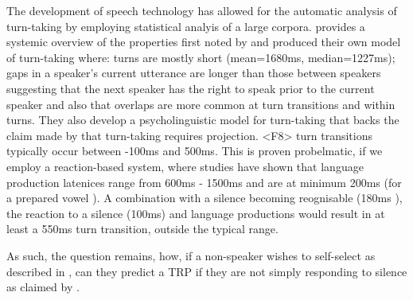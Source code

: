 \documentclass[logo,bsc,singlespacing,parskip]{infthesis}
\begin{document}
The development of speech technology has allowed for the automatic analysis of turn-taking by employing statistical analyis of a large corpora. \cite{LevTor2015} provides a systemic overview of the properties first noted by \cite{Sacks1974} and produced their own model of turn-taking where: turns are mostly short (mean=1680ms, median=1227ms); gaps in a speaker's current utterance are longer than those between speakers suggesting that the next speaker has the right to speak prior to the current speaker and also that overlaps are more common at turn transitions and within turns. They also develop a psycholinguistic model for turn-taking that backs the claim made by \cite{Sacks1974} that turn-taking requires projection. 
<F8>
\cite{LevTor2015} turn transitions typically occur between -100ms and 500ms. This is proven probelmatic, if we employ a reaction-based system, where studies have shown that language production latenices range from 600ms - 1500ms \cite{IndLev2004, Bates2003} and are at minimum 200ms (for a prepared vowel \cite{Fry1975}). A combination with a silence becoming reognisable (180ms \cite{}), the reaction to a silence (100ms) and language productions would result in at least a 550ms turn transition, outside the typical range. 

As such, the question remains, how, if a non-speaker wishes to self-select as described in \cite{Sacks1974}, can they predict a TRP if they are not simply responding to silence as claimed by \cite{HelEdl2010}. 
\end{document}
